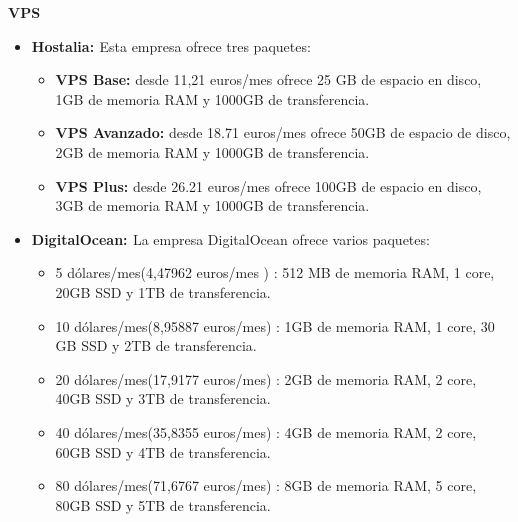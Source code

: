 \textbf{VPS}\\
\begin{itemize}
	\item \textbf{Hostalia: \cite{hostalia}} Esta empresa ofrece tres paquetes:\\ \label{host}
	\begin{itemize}
		\item \textbf{VPS Base: } desde 11,21 euros/mes ofrece 25 GB de espacio en disco,  1GB de memoria RAM y 1000GB de transferencia.
		\item \textbf{VPS Avanzado: } desde 18.71 euros/mes ofrece 50GB de espacio de disco, 2GB de memoria RAM y 1000GB de transferencia.
		\item \textbf{VPS Plus: } desde 26.21 euros/mes ofrece 100GB de espacio en disco, 3GB de memoria RAM y 1000GB de transferencia.
	\end{itemize}
	\item \textbf{DigitalOcean: \cite{digitalocean}} La empresa DigitalOcean ofrece varios paquetes:\\ \label{dg}
	\begin{itemize}
		\item 5 dólares/mes(4,47962 euros/mes \cite{divisas}) : 512 MB de memoria RAM, 1 core, 20GB SSD y  1TB de transferencia.
		\item 10 dólares/mes(8,95887 euros/mes) : 1GB de memoria RAM, 1 core, 30 GB SSD y 2TB de transferencia.
		\item 20 dólares/mes(17,9177 euros/mes) : 2GB de memoria RAM, 2 core, 40GB SSD y 3TB de transferencia.
		\item 40 dólares/mes(35,8355 euros/mes) : 4GB de memoria RAM, 2 core, 60GB SSD y 4TB de transferencia.
		\item 80 dólares/mes(71,6767 euros/mes) : 8GB de memoria RAM, 5 core, 80GB SSD y 5TB de transferencia.
	\end{itemize}
	

\end{itemize}
